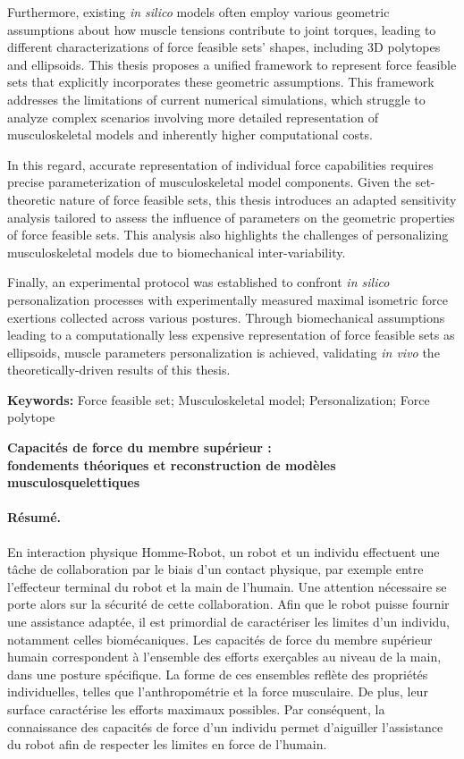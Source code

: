Furthermore, existing \emph{in silico} models often employ various geometric assumptions about how muscle tensions contribute to joint torques, leading to different characterizations of force feasible sets' shapes, including 3D polytopes and ellipsoids. This thesis proposes a unified framework to represent force feasible sets that explicitly incorporates these geometric assumptions. This framework addresses the limitations of current numerical simulations, which struggle to analyze complex scenarios involving more detailed representation of musculoskeletal models and inherently higher computational costs.

In this regard, accurate representation of individual force capabilities requires precise parameterization of musculoskeletal model components. Given the set-theoretic nature of force feasible sets, this thesis introduces an adapted sensitivity analysis tailored to assess the influence of parameters on the geometric properties of force feasible sets. This analysis also highlights the challenges of personalizing musculoskeletal models due to biomechanical inter-variability.

Finally, an experimental protocol was established to confront \emph{in silico} personalization processes with experimentally measured maximal isometric force exertions collected across various postures. Through biomechanical assumptions leading to a computationally less expensive representation of force feasible sets as ellipsoids, muscle parameters personalization is achieved, validating \emph{in vivo} the theoretically-driven results of this thesis.

\textbf{Keywords:} Force feasible set; Musculoskeletal model; Personalization; Force polytope

\clearpage
\begin{center}
    \textbf{Capacités de force du membre supérieur :}\\
    \textbf{fondements théoriques et reconstruction de modèles musculosquelettiques}
\end{center}
\paragraph*{Résumé.} En interaction physique Homme-Robot, un robot et un individu effectuent une tâche de collaboration par le biais d'un contact physique, par exemple entre l'effecteur terminal du robot et la main de l'humain. Une attention nécessaire se porte alors sur la sécurité de cette collaboration. Afin que le robot puisse fournir une assistance adaptée, il est primordial de caractériser les limites d'un individu, notamment celles biomécaniques. Les capacités de force du membre supérieur humain correspondent à l'ensemble des efforts exerçables au niveau de la main, dans une posture spécifique. La forme de ces ensembles reflète des propriétés individuelles, telles que l'anthropométrie et la force musculaire. De plus, leur surface caractérise les efforts maximaux possibles. Par conséquent, la connaissance des capacités de force d'un individu permet d'aiguiller l'assistance du robot afin de respecter les limites en force de l'humain.

